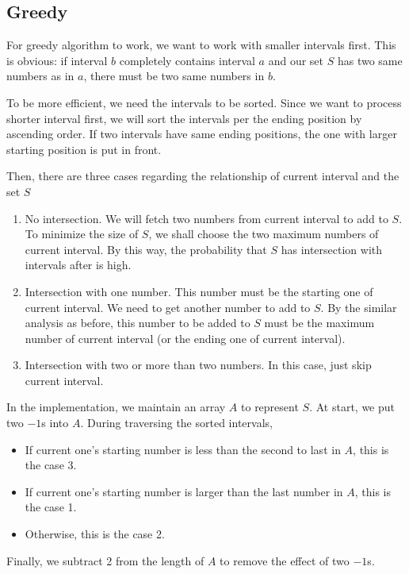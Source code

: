 \subsection{Greedy}
For greedy algorithm to work, we want to work with smaller intervals first. This is obvious: if interval $b$ completely contains interval $a$ and our set $S$ has two same numbers as in $a$, there must be two same numbers in $b$.

To be more efficient, we need the intervals to be sorted. Since we want to process shorter interval first, we will sort the intervals per the ending position by ascending order. If two intervals have same ending positions, the one with larger starting position is put in front. 

Then, there are three cases regarding the relationship of current interval and the set $S$ 
\begin{enumerate}
\item No intersection. We will fetch two numbers from current interval to add to $S$. To minimize the size of $S$, we shall choose the two maximum numbers of current interval. By this way, the probability that $S$ has intersection with intervals after is high.
\item Intersection with one number. This number must be the starting one of current interval. We need to get another number to add to $S$. By the similar analysis as before, this number to be added to $S$ must be the maximum number of current interval (or the ending one of current interval).
\item Intersection with two or more than two numbers. In this case, just skip current interval.
\end{enumerate}

In the implementation, we maintain an array $A$ to represent $S$. At start, we put two $-1$s into $A$. During traversing the sorted intervals, 

\begin{itemize}
\item If current one's starting number is less than the second to last in $A$, this is the case 3.
\item If current one's starting number is larger than the last number in $A$, this is the case 1.
\item Otherwise, this is the case 2.
\end{itemize}

Finally, we subtract 2 from the length of $A$ to remove the effect of two $-1$s.

